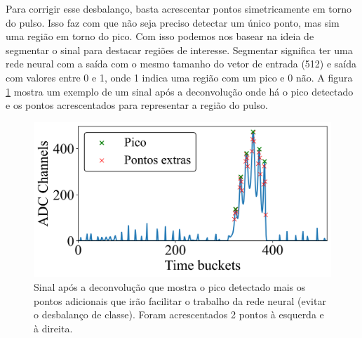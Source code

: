 \documentclass[a4paper,12pt,oneside]{book}
\begin{document}
\par Para corrigir esse desbalanço, basta acrescentar pontos simetricamente em torno do pulso. Isso faz com que não seja preciso detectar um único ponto, mas sim uma região em torno do pico. Com isso podemos nos basear na ideia de segmentar o sinal para destacar regiões de interesse\cite{aly2011research}. Segmentar significa ter uma rede neural com a saída com o mesmo tamanho do vetor de entrada (512) e saída com valores entre 0 e 1, onde 1 indica uma região com um pico e 0 não. A figura \ref{fig:n_peaks_exs} mostra um exemplo de um sinal após a deconvolução onde há o pico detectado e os pontos acrescentados para representar a região do pulso.


\begin{figure}[H]
    \centering
    \includegraphics[scale = 0.6]{figs/np_ex1.png}
    \caption{Sinal após a deconvolução que mostra o pico detectado mais os pontos adicionais que irão facilitar o trabalho da rede neural (evitar o desbalanço de classe). Foram acrescentados 2 pontos à esquerda e à direita.}
    \label{fig:n_peaks_exs}
\end{figure}
\end{document}
